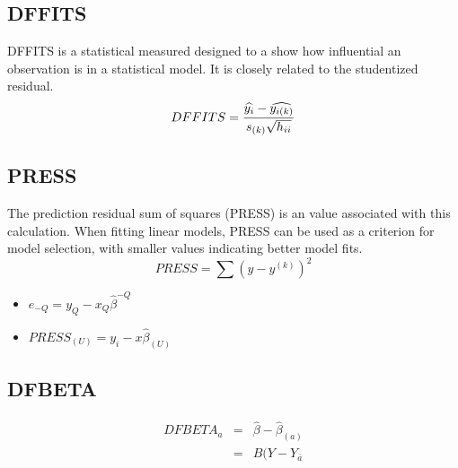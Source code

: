 \documentclass[12pt, a4paper]{report}
\theoremstyle{plain}
\theoremstyle{definition}
\theoremstyle{remark}
\begin{document}
\subsection{DFFITS} %
DFFITS is a statistical measured designed to a show how influential an observation is in a statistical model. It is closely related to the studentized residual.
\begin{displaymath} DFFITS = {\widehat{y_i} -
\widehat{y_{i(k)}} \over s_{(k)} \sqrt{h_{ii}}} \end{displaymath}


\subsection{PRESS} %
The prediction residual sum of squares (PRESS) is an value associated with this calculation. When fitting linear models, PRESS can be used as a criterion for model selection, with smaller values indicating better model fits.
\begin{equation}
PRESS = \sum(y-y^{(k)})^2
\end{equation}


\begin{itemize}
\item $e_{-Q} = y_{Q} - x_{Q}\hat{\beta}^{-Q}$
\item $PRESS_{(U)} = y_{i} - x\hat{\beta}_{(U)}$
\end{itemize}

\subsection{DFBETA} %
\begin{eqnarray}
DFBETA_{a} &=& \hat{\beta} - \hat{\beta}_{(a)} \\
&=& B(Y-Y_{\bar{a}}
\end{eqnarray}
\end{document}
